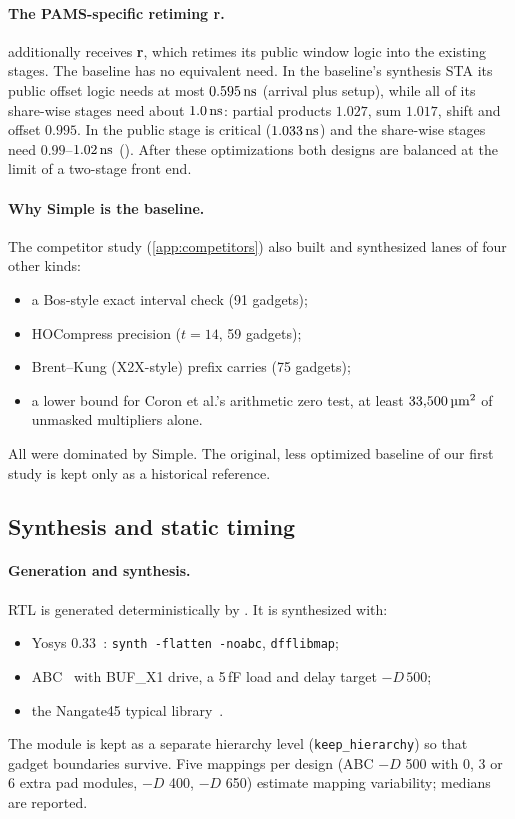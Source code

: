 \paragraph{The PAMS-specific retiming r.}
\PAMS{} additionally receives \textbf{r}, which retimes its public window logic into the existing stages. The baseline has no equivalent need. In the baseline's synthesis STA its public offset logic needs at most $0.595\,\si{\nano\second}$ (arrival plus setup), while all of its share-wise stages need about $1.0\,\si{\nano\second}$: partial products $1.027$, sum $1.017$, shift and offset $0.995$. In \PAMS{} the public stage is critical ($1.033\,\si{\nano\second}$) and the share-wise stages need $0.99$--$1.02\,\si{\nano\second}$ (). After these optimizations both designs are balanced at the limit of a two-stage front end.

\paragraph{Why Simple is the baseline.}
The competitor study (\cref{app:competitors}) also built and synthesized lanes of four other kinds:
\begin{itemize}
  \item a Bos-style exact interval check (91 gadgets);
  \item HOCompress precision ($t = 14$, 59 gadgets);
  \item Brent--Kung (X2X-style) prefix carries (75 gadgets);
  \item a lower bound for Coron et al.'s arithmetic zero test, at least $33{,}500\,\si{\micro\meter\squared}$ of unmasked multipliers alone.
\end{itemize}
All were dominated by Simple. The original, less optimized baseline of our first study is kept only as a historical reference.

\subsection{Synthesis and static timing}
\paragraph{Generation and synthesis.} RTL is generated deterministically by . It is synthesized with:
\begin{itemize}
  \item Yosys 0.33~\cite{yosys}: \texttt{synth -flatten -noabc}, \texttt{dfflibmap};
  \item ABC~\cite{brayton2010abc} with BUF\_X1 drive, a 5\,fF load and delay target $-D\,500$;
  \item the Nangate45 typical library~\cite{nangate45}.
\end{itemize}
The  module is kept as a separate hierarchy level (\texttt{keep\_hierarchy}) so that gadget boundaries survive. Five mappings per design (ABC $-D$ 500 with 0, 3 or 6 extra pad modules, $-D$ 400, $-D$ 650) estimate mapping variability; medians are reported.

